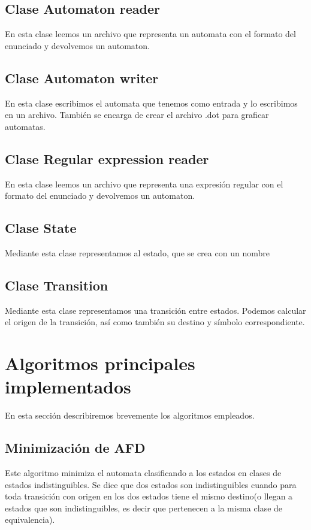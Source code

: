 \documentclass[a4paper]{article}
\begin{document}
\subsection{Clase Automaton reader}
En esta clase leemos un archivo que representa un automata con el formato del enunciado y devolvemos un automaton.


\subsection{Clase Automaton writer}
En esta clase escribimos el automata que tenemos como entrada y lo escribimos en un archivo.
También se encarga de crear el archivo .dot para graficar automatas.


\subsection{Clase Regular expression reader}
En esta clase leemos un archivo que representa una expresión regular con el formato del enunciado y devolvemos un automaton.

\subsection{Clase State }
Mediante esta clase representamos al estado, que se crea con un nombre

\subsection{Clase Transition }
Mediante esta clase representamos una transición entre estados. Podemos calcular el origen de la transición, así como también su destino y símbolo correspondiente.


\section{Algoritmos principales implementados}

En esta sección describiremos brevemente los algoritmos empleados.
\subsection{Minimización de AFD}
Este algoritmo minimiza el automata clasificando a los estados en clases de estados indistinguibles. Se dice que dos estados son indistinguibles cuando para toda transición con origen en los dos estados tiene el mismo destino(o llegan a estados que son indistinguibles, es decir que pertenecen a la misma clase de equivalencia).
\end{document}
